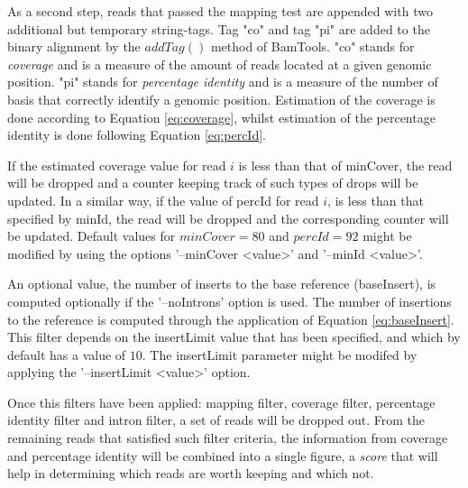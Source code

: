 \documentclass[11pt]{article}
\begin{document}
{As a second step, reads that passed the mapping test are appended with two additional but temporary 
string-tags. Tag "co" and tag "pi" are added to the binary alignment by the $addTag()$ method of BamTools. 
"co" stands for \emph{coverage} and is a measure of the amount of reads located at a given genomic position. "pi" stands for \emph{percentage identity} and is a measure of the number of basis that correctly identify 
a genomic position. Estimation of the coverage is done according to Equation \ref{eq:coverage}, whilst estimation of the percentage identity is done following Equation \ref{eq:percId}. 

If the estimated coverage value for read $i$ is less than that of minCover, the read will be dropped and 
a counter keeping track of such types of drops will be updated. In a similar way, if the value of percId 
for read $i$, is less than that specified by minId, the read will be dropped and the corresponding counter 
will be updated. Default values for $minCover=80$ and $percId=92$ might be modified by using the options 
'--minCover <value>' and '--minId <value>'.

An optional value, the number of inserts to the base reference (baseInsert), is computed optionally if 
the '--noIntrons' option is used. The number of insertions to the reference is computed through the 
application of Equation \ref{eq:baseInsert}. This filter depends on the insertLimit value that has been 
specified, and which by default has a value of $10$. The insertLimit parameter might be modifed by 
applying the '--insertLimit <value>' option.

Once this filters have been applied: mapping filter, coverage filter, percentage identity filter and intron 
filter, a set of reads will be dropped out. From the remaining reads that satisfied such filter criteria, 
the information from coverage and percentage identity will be combined into a single figure, a \emph{score} 
that will help in determining which reads are worth keeping and which not.


}
\end{document}
